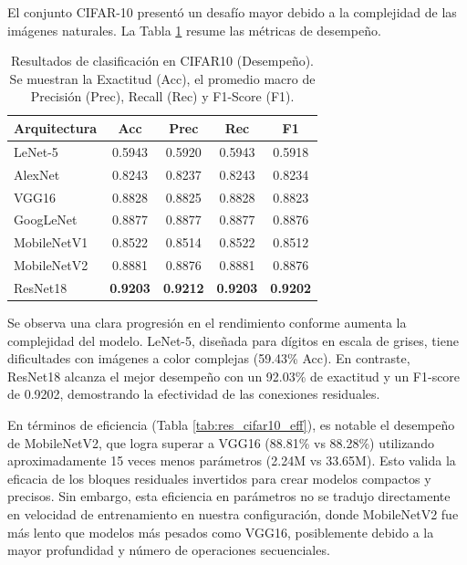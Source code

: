 \documentclass{pas}
\begin{document}
El conjunto CIFAR-10 presentó un desafío mayor debido a la complejidad de las imágenes naturales. La Tabla \ref{tab:res_cifar10_perf} resume las métricas de desempeño.

\begin{table}[H]
\centering
\caption{Resultados de clasificación en CIFAR10 (Desempeño). Se muestran la Exactitud (Acc), el promedio macro de Precisión (Prec), Recall (Rec) y F1-Score (F1).}
\label{tab:res_cifar10_perf}
\begin{tabular}{lcccc}
\hline
\textbf{Arquitectura} & \textbf{Acc} & \textbf{Prec} & \textbf{Rec} & \textbf{F1} \\ \hline
LeNet-5 & 0.5943 & 0.5920 & 0.5943 & 0.5918 \\
AlexNet & 0.8243 & 0.8237 & 0.8243 & 0.8234 \\
VGG16 & 0.8828 & 0.8825 & 0.8828 & 0.8823 \\
GoogLeNet & 0.8877 & 0.8877 & 0.8877 & 0.8876 \\
MobileNetV1 & 0.8522 & 0.8514 & 0.8522 & 0.8512 \\
MobileNetV2 & 0.8881 & 0.8876 & 0.8881 & 0.8876 \\
ResNet18 & \textbf{0.9203} & \textbf{0.9212} & \textbf{0.9203} & \textbf{0.9202} \\
\hline
\end{tabular}
\end{table}

Se observa una clara progresión en el rendimiento conforme aumenta la complejidad del modelo. LeNet-5, diseñada para dígitos en escala de grises, tiene dificultades con imágenes a color complejas (59.43\% Acc). En contraste, ResNet18 alcanza el mejor desempeño con un 92.03\% de exactitud y un F1-score de 0.9202, demostrando la efectividad de las conexiones residuales.

En términos de eficiencia (Tabla \ref{tab:res_cifar10_eff}), es notable el desempeño de MobileNetV2, que logra superar a VGG16 (88.81\% vs 88.28\%) utilizando aproximadamente 15 veces menos parámetros (2.24M vs 33.65M). Esto valida la eficacia de los bloques residuales invertidos para crear modelos compactos y precisos. Sin embargo, esta eficiencia en parámetros no se tradujo directamente en velocidad de entrenamiento en nuestra configuración, donde MobileNetV2 fue más lento que modelos más pesados como VGG16, posiblemente debido a la mayor profundidad y número de operaciones secuenciales.
\end{document}
